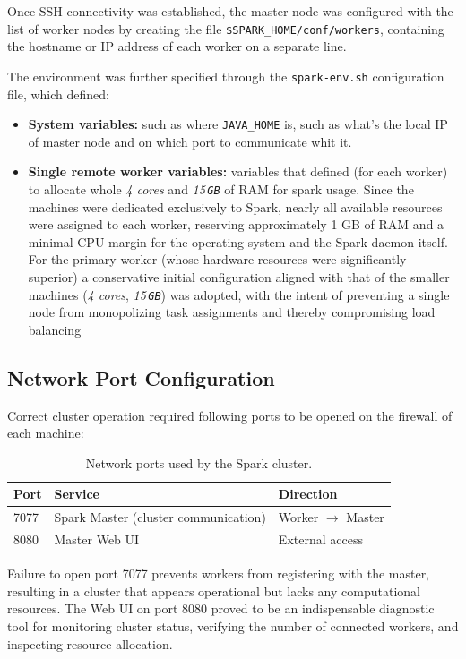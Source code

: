 \documentclass[../main.tex]{subfiles}
\begin{document}
Once SSH connectivity was established, the master node was configured with the list of worker nodes by creating the file \texttt{\$SPARK\_HOME/conf/workers}, containing the hostname or IP address of each worker on a separate line. 

The environment was further specified through the \texttt{spark-env.sh} configuration file, which defined:
\begin{itemize}
    \item \textbf{System variables:} such as where \texttt{JAVA\_HOME} is, such as what's the local IP of master node and on which port to communicate whit it.
    \item \textbf{Single remote worker variables:} variables that defined (for each worker) to allocate whole \textit{4 cores} and \textit{15\,\texttt{GB}} of RAM for spark usage. Since the machines were dedicated exclusively to Spark, nearly all available resources were assigned to each worker, reserving approximately 1 GB of RAM and a minimal CPU margin for the operating system and the Spark daemon itself. For the primary worker (whose hardware resources were significantly superior) a conservative initial configuration aligned with that of the smaller machines (\textit{4 cores}, \textit{15\,\texttt{GB}}) was adopted, with the intent of preventing a single node from monopolizing task assignments and thereby compromising load balancing
\end{itemize}

\subsection{Network Port Configuration}

Correct cluster operation required following ports to be opened on the firewall of each machine:

\begin{table}[H]
\centering
\begin{tabular}{lll}
\toprule
\textbf{Port} & \textbf{Service} & \textbf{Direction} \\
\midrule
7077 & Spark Master (cluster communication) & Worker $\rightarrow$ Master \\
8080 & Master Web UI & External access \\
\bottomrule
\end{tabular}
\caption{Network ports used by the Spark cluster.}
\end{table}

Failure to open port 7077 prevents workers from registering with the master, resulting in a cluster that appears operational but lacks any computational resources. The Web UI on port 8080 proved to be an indispensable diagnostic tool for monitoring cluster status, verifying the number of connected workers, and inspecting resource allocation.
\end{document}
